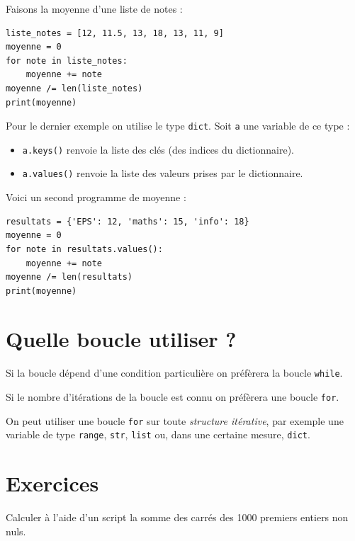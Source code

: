 Faisons la moyenne d'une liste de notes :


\begin{pyc}
\begin{verbatim}
liste_notes = [12, 11.5, 13, 18, 13, 11, 9]
moyenne = 0
for note in liste_notes:
    moyenne += note
moyenne /= len(liste_notes)
print(moyenne)
\end{verbatim}
\end{pyc}

Pour le dernier exemple on utilise le type \texttt{dict}. Soit \texttt{a} une variable de ce type :
\begin{itemize}
    \item   \texttt{a.keys()} renvoie la liste des clés (des indices du dictionnaire).
    \item   \texttt{a.values()} renvoie la liste des valeurs prises par le dictionnaire.
\end{itemize}

Voici un second programme de moyenne :

\begin{pyc}
\begin{verbatim}
resultats = {'EPS': 12, 'maths': 15, 'info': 18}
moyenne = 0
for note in resultats.values():
    moyenne += note
moyenne /= len(resultats)
print(moyenne)
\end{verbatim}
\end{pyc}

\section{Quelle boucle utiliser ?}

Si la boucle dépend d'une condition particulière on préfèrera la boucle \texttt{while}.

Si le nombre d'itérations de la boucle est connu on préfèrera une boucle \texttt{for}.

On peut utiliser une boucle \texttt{for} sur toute \textit{structure itérative}, par exemple 
    une variable de type \texttt{range}, \texttt{str}, \texttt{list} ou, dans une certaine mesure, \texttt{dict}.
    
\section{Exercices}
\begin{exercice}
    Calculer à l'aide d'un script la somme des carrés des 1000 premiers entiers non nuls.
\end{exercice}

